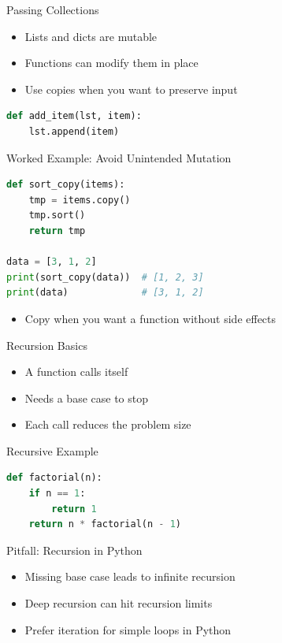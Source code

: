 \documentclass{beamer}
\begin{document}
\begin{frame}[fragile]{Passing Collections}
  \begin{itemize}[<+->]
    \item Lists and dicts are mutable
    \item Functions can modify them in place
    \item Use copies when you want to preserve input
  \end{itemize}
  \vspace{0.4em}
  \begin{lstlisting}[language=Python]
def add_item(lst, item):
    lst.append(item)
  \end{lstlisting}
\end{frame}

\begin{frame}[fragile]{Worked Example: Avoid Unintended Mutation}
  \begin{lstlisting}[language=Python]
def sort_copy(items):
    tmp = items.copy()
    tmp.sort()
    return tmp

data = [3, 1, 2]
print(sort_copy(data))  # [1, 2, 3]
print(data)             # [3, 1, 2]
  \end{lstlisting}
  \begin{itemize}[<+->]
    \item Copy when you want a function without side effects
  \end{itemize}
\end{frame}

\begin{frame}[fragile]{Recursion Basics}
  \begin{itemize}[<+->]
    \item A function calls itself
    \item Needs a base case to stop
    \item Each call reduces the problem size
  \end{itemize}
\end{frame}

\begin{frame}[fragile]{Recursive Example}
  \begin{lstlisting}[language=Python]
def factorial(n):
    if n == 1:
        return 1
    return n * factorial(n - 1)
  \end{lstlisting}
\end{frame}

\begin{frame}[fragile]{Pitfall: Recursion in Python}
  \begin{itemize}[<+->]
    \item Missing base case leads to infinite recursion
    \item Deep recursion can hit recursion limits
    \item Prefer iteration for simple loops in Python
  \end{itemize}
\end{frame}
\end{document}
